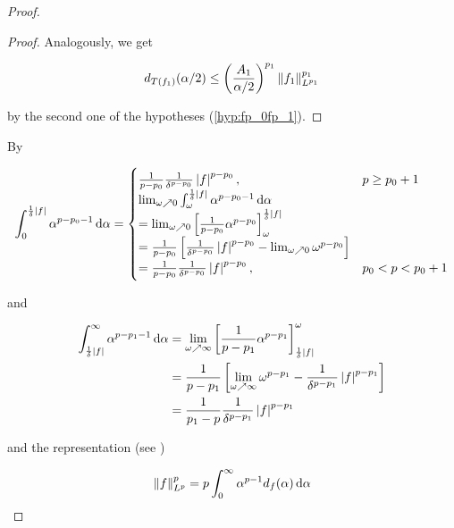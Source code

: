 \begin{proof}
\begin{proof}
Analogously, we get  

\begin{equation*}
	d_{T(f_1)}(\alpha/2) \leq \del{\frac{A_1}{\alpha/2}}^{p_1} \norm[0]{f_1}^{p_1}_{L^{p_1}}
	\label{est:p_1}
\end{equation*}

\noindent by the second one of the hypotheses (\ref{hyp:fp_0fp_1}).
\end{proof}

By

\begin{equation*}
	\begin{aligned}
		\int_0^{\frac{1}{\delta}\abs[0]{ f}}\alpha^{p-p_0-1} \d\alpha = 
			\begin{cases}
				\frac{1}{p-p_0}\frac{1}{\delta^{p-p_0}}\abs[0]{ f }^{p - p_0}, & p \geq p_0 + 1\\
				\lim_{\omega \nearrow 0} \int_\omega^{\frac{1}{\delta}\abs[0]{ f}}\alpha^{p-p_0-1} \d\alpha\\
				= \lim_{\omega \nearrow 0}\sbr{\frac{1}{p-p_0}\alpha^{p - p_0}}_\omega^{\frac{1}{\delta}\abs[0]{ f}}\\
				= \frac{1}{p-p_0}\sbr{\frac{1}{\delta^{p-p_0}}\abs[0]{ f }^{p - p_0} - \lim_{\omega \nearrow 0} \omega^{p-p_0}}\\
				= \frac{1}{p-p_0}\frac{1}{\delta^{p-p_0}} \abs[0]{ f}^{p - p_0}, & p_0 < p < p_0 + 1
			\end{cases}
	\end{aligned}
\end{equation*}

\noindent and

\begin{equation*}
	\begin{aligned}
		\int_{\frac{1}{\delta}\abs[0]{ f}}^{\infty}\alpha^{p-p_1-1} \d\alpha &= \lim_{\omega \nearrow \infty} \sbr{ \frac{1}{p - p_1} \alpha^{p - p_1}}^\omega_{\frac{1}{\delta}\abs[0]{ f}}\\
		&= \frac{1}{p - p_1} \sbr{ \lim_{\omega \nearrow \infty} \omega^{p - p_1} - \frac{1}{\delta^{p - p_1}} \abs[0]{ f}^{p - p_1}}\\
		&= \frac{1}{p_1 - p}\frac{1}{\delta^{p-p_1}} \abs[0]{ f }^{p - p_1}
	\end{aligned}
\end{equation*}

\noindent and the representation (see \cite[5]{grafakos:fourier:2014}) 

\begin{equation*}
	\norm[0]{f}^p_{L^p} = p \int_0^{\infty} \alpha^{p-1}d_f(\alpha) \d\alpha
\end{equation*}


\end{proof}
